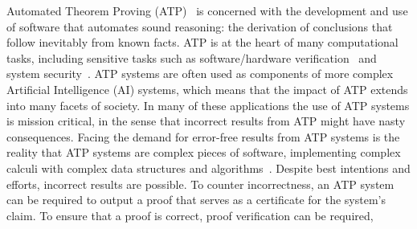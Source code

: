 \documentclass{ceurart}
\newcommand{\smalltt}[1]{\small \texttt{#1}}
\begin{document}
Automated Theorem Proving (ATP)~\cite{RV01-HAR} is concerned with the development and use of 
software that automates sound reasoning: the derivation of conclusions that follow inevitably 
from known facts.
ATP is at the heart of many computational tasks, including sensitive tasks such as 
software/hardware verification~\cite{HH19} and system security~\cite{Coo18}.
ATP systems are often used as components of more complex Artificial Intelligence (AI) systems,
which means that the impact of ATP extends into many facets of society.
In many of these applications the use of ATP systems is mission critical, in the sense that 
incorrect results from ATP might have nasty consequences.
Facing the demand for error-free results from ATP systems is the reality that ATP systems
are complex pieces of software, implementing complex calculi with complex data structures and
algorithms~\cite{Sch06}. 
Despite best intentions and efforts, incorrect results are possible.
To counter incorrectness, an ATP system can be required to output a proof
that serves as a certificate for the system's claim.
To ensure that a 
proof is correct, proof verification can be required, 
\end{document}
